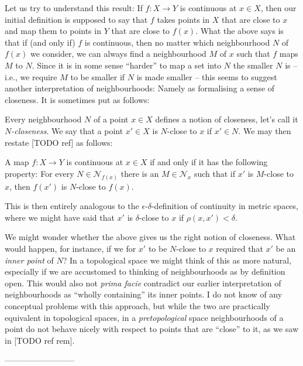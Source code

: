 \documentclass[article, a4paper, 11pt, oneside]{memoir}
\numberwithin{equation}{chapter}
\newcommand{\calN}{\mathcal{N}}
\newcommand{\nhoods}[1]{\calN_{#1}}
\newenvironment{displaytheorem}{%
    \begin{displayquote}\itshape%
}{%
    \end{displayquote}%
}
\begin{document}
Let us try to understand this result: If $f \colon X \to Y$ is continuous at $x \in X$, then our initial definition is supposed to say that $f$ takes points in $X$ that are close to $x$ and map them to points in $Y$ that are close to $f(x)$. What the above says is that if (and only if) $f$ is continuous, then no matter which neighbourhood $N$ of $f(x)$ we consider, we can always find a neighbourhood $M$ of $x$ such that $f$ maps $M$ to $N$. Since it is in some sense \enquote{harder} to map a set into $N$ the smaller $N$ is -- i.e., we require $M$ to be smaller if $N$ is made smaller -- this seems to suggest another interpretation of neighbourhoods: Namely as formalising a sense of closeness. It is sometimes put as follows:

Every neighbourhood $N$ of a point $x \in X$ defines a notion of closeness, let's call it \emph{$N$-closeness}. We say that a point $x' \in X$ is $N$-close to $x$ if $x' \in N$. We may then restate [TODO ref] as follows:
%
\begin{displaytheorem}
    A map $f \colon X \to Y$ is continuous at $x \in X$ if and only if it has the following property: For every $N \in \nhoods{f(x)}$ there is an $M \in \nhoods{x}$ such that if $x'$ is $M$-close to $x$, then $f(x')$ is $N$-close to $f(x)$.
\end{displaytheorem}
%
This is then entirely analogous to the $\epsilon$-$\delta$-definition of continuity in metric spaces, where we might have said that $x'$ is $\delta$-close to $x$ if $\rho(x,x') < \delta$.

We might wonder whether the above gives us the right notion of closeness. What would happen, for instance, if we for $x'$ to be $N$-close to $x$ required that $x'$ be an \emph{inner point} of $N$? In a topological space we might think of this as more natural, especially if we are accustomed to thinking of neighbourhoods as by definition open. This would also not \emph{prima facie} contradict our earlier interpretation of neighbourhoods as \enquote{wholly containing} its inner points. I do not know of any conceptual problems with this approach, but while the two are practically equivalent in topological spaces, in a \emph{pretopological} space neighbourhoods of a point do not behave nicely with respect to points that are \enquote{close} to it, as we saw in [TODO ref rem].

--------------------------
\end{document}
